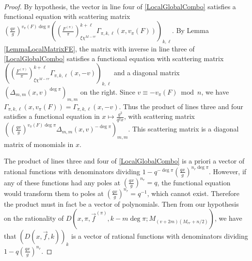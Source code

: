 \documentclass[11pt,letterpaper]{article}
\theoremstyle{definition}
\theoremstyle{remark}
\numberwithin{equation}{section}
\theoremstyle{dotless}
\newcommand{\res}[2]{\left(\frac{#1}{#2}\right)}
\begin{document}
\begin{proof}
By hypothesis, the vector in line four of \eqref{LocalGlobalCombo} 
satisfies a functional equation with scattering matrix $\left(\frac{qx}{g} \right)^{v_{\pi}(F) \deg \pi} \left( \res{F^{(\pi)}}{\pi}_{\xi \chi^{M-{rr}}}^{k+\ell} \Gamma_{\pi, k, \ell}(x, v_{\pi}(F)) \right)_{k, \ell}$. By Lemma \ref{LemmaLocalMatrixFE}, the matrix with inverse in line three of \eqref{LocalGlobalCombo}
satisfies a functional equation with scattering matrix $\left( \res{F^{(\pi)}}{\pi}_{\xi \chi^{M-{rr}}}^{k+\ell} \Gamma_{\pi, k, \ell}(x, -v) \right)_{k, \ell}$ and a diagonal matrix $\left(\Delta_{m,m}(x, v)^{\deg \pi} \right)_{m,m}$ on the right. Since $v\equiv -v_{\pi}(F) \bmod n$, we have $ \Gamma_{\pi, k, \ell}(x, v_{\pi}(F))=\Gamma_{\pi, k, \ell}(x, -v)$. Thus the product of lines three and four satisfies a functional equation in $x\mapsto \frac{g^2}{q^2 x}$, with scattering matrix $\left(\left(\frac{qx}{g} \right)^{v_{\pi}(F) \deg \pi} \Delta_{m,m}(x, v)^{-\deg \pi} \right)_{m,m}$. This scattering matrix is a diagonal matrix of monomials in $x$.

The product of lines three and four of \eqref{LocalGlobalCombo} is a priori a vector of rational functions with denominators dividing $1-q^{-\deg \pi}\left(\frac{qx}{g}\right)^{n_r\deg \pi}$. However, if any of these functions had any poles at $\left(\frac{qx}{g}\right)^{n_r}=q$, the functional equation would transform them to poles at $\left(\frac{qx}{g}\right)^{n_r}=q^{-1}$, which cannot exist. Therefore the product must in fact be a vector of polynomials. Then from our hypothesis on the rationality of $D(x, \pi, \vec{f}^{(\pi)}, k-m\deg \pi; M_{(v+2m)(M_{rr}+n/2)})$, we have that $\left( D(x, \vec{f}, k) \right)_k$ is a vector of rational functions with denominators dividing $1-q\left(\frac{qx}{g}\right)^{n_r}$.


\end{proof}
\end{document}
